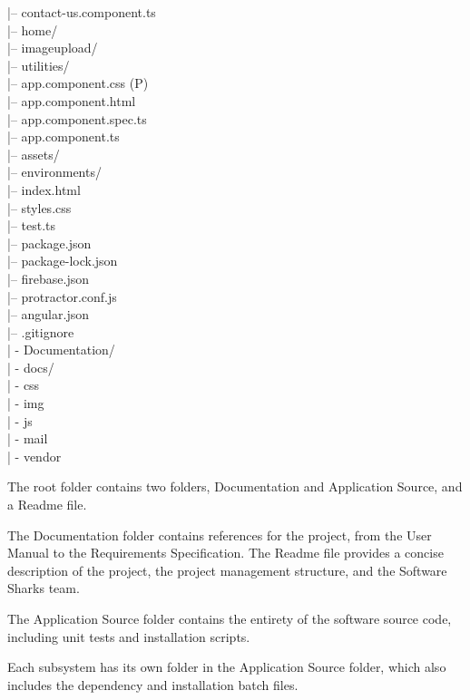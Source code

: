 \documentclass[a4paper, 11pt]{article}
\begin{document}
\begin{tabbing}
\>\>\>\>\>\>				|-- contact-us.component.ts\\
\>\>\>\>\>			|-- home/\\
\>\>\>\>\>				|-- imageupload/\\
\>\>\>\>\>			|-- utilities/\\
\>\>\>\>\>				|-- app.component.css (P)\\
\>\>\>\>\>				|-- app.component.html\\
\>\>\>\>\>				|-- app.component.spec.ts\\
\>\>\>\>\>			|-- app.component.ts\\
\>\>\>		|-- assets/ \\
\>\>\>		|-- environments/ \\
\>\>\>		|-- index.html \\
\>\>\>		|-- styles.css \\
\>\>\>		|-- test.ts \\
\>\>	|-- package.json \\
\>\>	|-- package-lock.json\\
\>\>	|-- firebase.json \\
\>\>	|-- protractor.conf.js \\
\>\>	|-- angular.json \\
\>|-- .gitignore \\
| - Documentation/ \\
| - docs/ \\
     \>| -  css\\
     \>| -  img\\
     \>| -  js\\
     \>| -  mail\\
     \>| -  vendor\\
\end{tabbing}


The root folder contains two folders, Documentation and Application Source, and a Readme file.

The Documentation folder contains references for the project, from the User Manual to the Requirements Specification.
The Readme file provides a concise description of the project, the project management structure, and the Software Sharks team.

The Application Source folder contains the entirety of the software source code, including unit tests and installation scripts.

Each subsystem has its own folder in the Application Source folder, which also includes the dependency and installation batch files.
\end{document}
